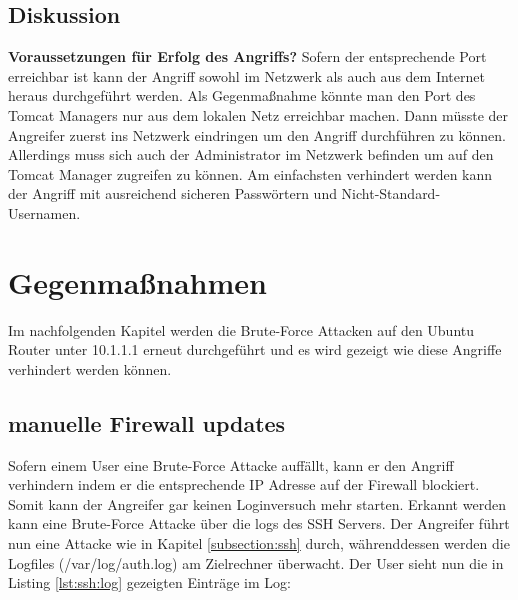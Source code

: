 \documentclass[a4paper,12pt]{article} %
\begin{document}
\subsection{Diskussion}
\textbf{Voraussetzungen für Erfolg des Angriffs?}
Sofern der entsprechende Port erreichbar ist kann der Angriff sowohl im Netzwerk als auch aus dem Internet heraus durchgeführt werden. Als Gegenmaßnahme könnte man den Port des Tomcat Managers nur aus dem lokalen Netz erreichbar machen. Dann müsste der Angreifer zuerst ins Netzwerk eindringen um den Angriff durchführen zu können. Allerdings muss sich auch der Administrator im Netzwerk befinden um auf den Tomcat Manager zugreifen zu können. Am einfachsten verhindert werden kann der Angriff mit ausreichend sicheren Passwörtern und Nicht-Standard-Usernamen.

\section{Gegenmaßnahmen}
\label{section:gegen}
Im nachfolgenden Kapitel werden die Brute-Force Attacken auf den Ubuntu Router unter 10.1.1.1 erneut durchgeführt und es wird gezeigt wie diese Angriffe verhindert werden können.

\subsection{manuelle Firewall updates}
Sofern einem User eine Brute-Force Attacke auffällt, kann er den Angriff verhindern indem er die entsprechende IP Adresse auf der Firewall blockiert. Somit kann der Angreifer gar keinen Loginversuch mehr starten. Erkannt werden kann eine Brute-Force Attacke über die logs des SSH Servers. Der Angreifer führt nun eine Attacke wie in Kapitel \ref{subsection:ssh} durch, währenddessen werden die Logfiles (/var/log/auth.log) am Zielrechner überwacht. Der User sieht nun die in Listing \ref{lst:ssh:log} gezeigten Einträge im Log:
\end{document}
